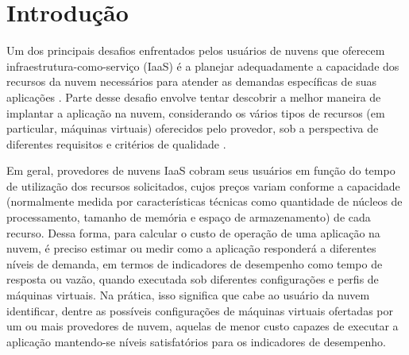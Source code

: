 \documentclass[12pt]{article}
\begin{document}
\section{Introdução}\label{sec:introducao}


Um dos principais desafios enfrentados pelos usuários de nuvens que oferecem infraestrutura-como-serviço (IaaS) é a planejar adequadamente a capacidade dos recursos da nuvem necessários para atender as demandas específicas de suas aplicações \cite{Menasce2009}.  Parte desse desafio envolve tentar descobrir a melhor maneira de implantar a aplicação na nuvem, considerando os vários tipos de recursos (em particular, máquinas virtuais) oferecidos pelo provedor, sob a perspectiva de diferentes requisitos e critérios de qualidade \cite{GoncalvesJunior2015}.  

Em geral, provedores de nuvens IaaS cobram seus usuários em função do tempo de utilização dos recursos solicitados, cujos preços variam conforme a capacidade (normalmente medida por características técnicas como quantidade de núcleos de processamento, tamanho de memória e espaço de armazenamento) de cada recurso. Dessa forma, para calcular o custo de operação de uma aplicação na nuvem, é preciso estimar ou medir como a aplicação responderá a diferentes níveis de demanda, em termos de indicadores de desempenho como tempo de resposta ou vazão, quando executada sob diferentes configurações e perfis de máquinas virtuais. Na prática, isso significa que cabe ao usuário da nuvem identificar, dentre as possíveis configurações de máquinas virtuais ofertadas por um ou mais provedores de nuvem, aquelas de menor custo capazes de executar a aplicação mantendo-se níveis satisfatórios para os indicadores de desempenho.

\end{document}
